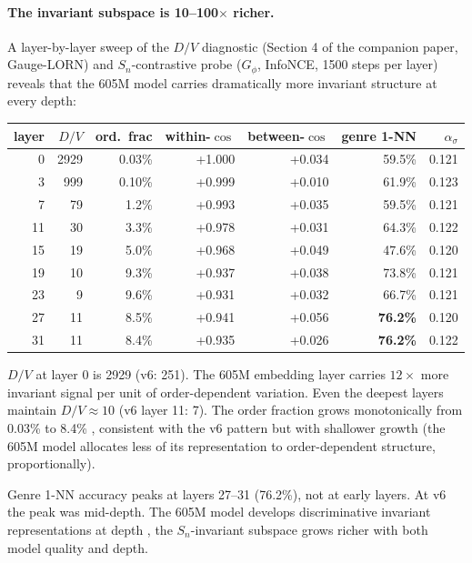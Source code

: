 \documentclass[11pt, a4paper]{article}
\theoremstyle{plain}
\theoremstyle{definition}
\theoremstyle{remark}
\begin{document}
\paragraph{The invariant subspace is 10--100$\times$ richer.}

A layer-by-layer sweep of the $D/V$ diagnostic (Section 4 of the companion paper, Gauge-LORN) and $S_n$-contrastive probe ($G_\phi$, InfoNCE, 1500 steps per layer) reveals that the 605M model carries dramatically more invariant structure at every depth:

\begin{center}
\small
\begin{tabular}{rrrrrrr}
\toprule
layer & $D/V$ & ord.\ frac & within-$\cos$ & between-$\cos$ & genre 1-NN & $\alpha_\sigma$ \\
\midrule
0  & 2929 & 0.03\% & +1.000 & +0.034 & 59.5\% & 0.121 \\
3  & 999  & 0.10\% & +0.999 & +0.010 & 61.9\% & 0.123 \\
7  & 79   & 1.2\%  & +0.993 & +0.035 & 59.5\% & 0.121 \\
11 & 30   & 3.3\%  & +0.978 & +0.031 & 64.3\% & 0.122 \\
15 & 19   & 5.0\%  & +0.968 & +0.049 & 47.6\% & 0.120 \\
19 & 10   & 9.3\%  & +0.937 & +0.038 & 73.8\% & 0.121 \\
23 & 9    & 9.6\%  & +0.931 & +0.032 & 66.7\% & 0.121 \\
27 & 11   & 8.5\%  & +0.941 & +0.056 & \textbf{76.2\%} & 0.120 \\
31 & 11   & 8.4\%  & +0.935 & +0.026 & \textbf{76.2\%} & 0.122 \\
\bottomrule
\end{tabular}
\end{center}

$D/V$ at layer 0 is 2929 (v6: 251). The 605M embedding layer carries $12\times$ more invariant signal per unit of order-dependent variation. Even the deepest layers maintain $D/V \approx 10$ (v6 layer 11: 7). The order fraction grows monotonically from 0.03\% to 8.4\% ,  consistent with the v6 pattern but with shallower growth (the 605M model allocates less of its representation to order-dependent structure, proportionally).

Genre 1-NN accuracy peaks at layers 27--31 (76.2\%), not at early layers. At v6 the peak was mid-depth. The 605M model develops discriminative invariant representations at depth ,  the $S_n$-invariant subspace grows richer with both model quality and depth.
\end{document}
